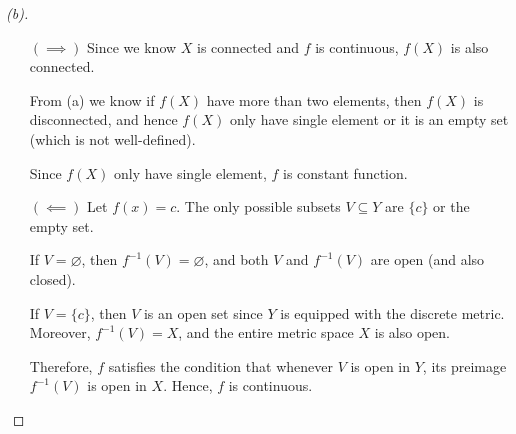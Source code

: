 \begin{proof}[(b)]
    \vphantom{text}
    \begin{itemize}
        \item [\((\implies )\)] Since we know $X$ is connected and $f$ is continuous, $f(X)$ is also connected.
        
        From (a) we know if $f(X)$ have more than two elements, then $f(X)$ is disconnected, and hence $f(X)$ only have single element or it is an empty set (which is not well-defined).
        
        Since $f(X)$ only have single element, $f$ is constant function.
        
        \item [\((\impliedby )\)] Let $f(x) = c$. The only possible subsets $V \subseteq Y$ are $\{c\}$ or the empty set.  

        If $V = \varnothing$, then $f^{-1}(V) = \varnothing$, and both $V$ and $f^{-1}(V)$ are open (and also closed).  
        
        If $V = \{c\}$, then $V$ is an open set since $Y$ is equipped with the discrete metric. Moreover, $f^{-1}(V) = X$, and the entire metric space $X$ is also open.  
        
        Therefore, $f$ satisfies the condition that whenever $V$ is open in $Y$, its preimage $f^{-1}(V)$ is open in $X$. Hence, $f$ is continuous.
    \end{itemize}
\end{proof}

